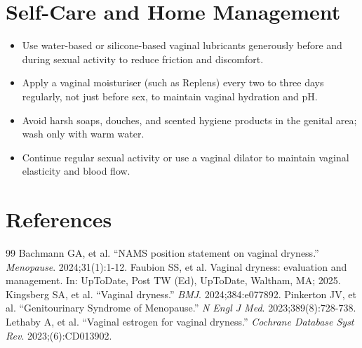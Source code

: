 \section*{Self-Care and Home Management}
\begin{itemize}
  \item Use water-based or silicone-based vaginal lubricants generously before and during sexual activity to reduce friction and discomfort.
  \item Apply a vaginal moisturiser (such as Replens) every two to three days regularly, not just before sex, to maintain vaginal hydration and pH.
  \item Avoid harsh soaps, douches, and scented hygiene products in the genital area; wash only with warm water.
  \item Continue regular sexual activity or use a vaginal dilator to maintain vaginal elasticity and blood flow.
\end{itemize}

\section*{References}
\begin{thebibliography}{99}
 Bachmann GA, et al. ``NAMS position statement on vaginal dryness.'' \emph{Menopause}. 2024;31(1):1-12.
 Faubion SS, et al. Vaginal dryness: evaluation and management. In: UpToDate, Post TW (Ed), UpToDate, Waltham, MA; 2025.
 Kingsberg SA, et al. ``Vaginal dryness.'' \emph{BMJ}. 2024;384:e077892.
 Pinkerton JV, et al. ``Genitourinary Syndrome of Menopause.'' \emph{N Engl J Med}. 2023;389(8):728-738.
 Lethaby A, et al. ``Vaginal estrogen for vaginal dryness.'' \emph{Cochrane Database Syst Rev}. 2023;(6):CD013902.
\end{thebibliography}
